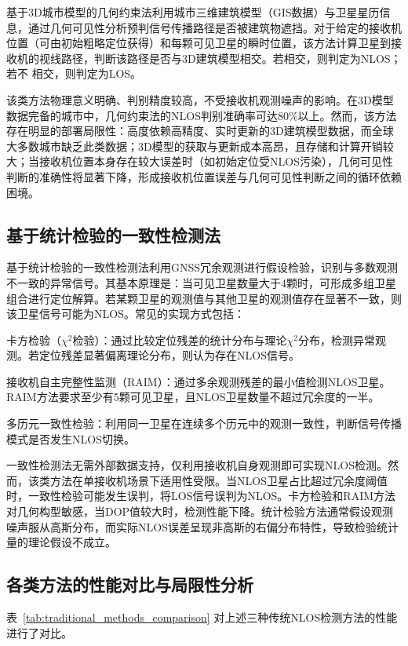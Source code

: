     基于3D城市模型的几何约束法利用城市三维建筑模型（GIS数据）与卫星星历信息，通过几何可见性分析预判信号传播路径是否被建筑物遮挡。对于给定的接收机位置（可由初始粗略定位获得）和每颗可见卫星的瞬时位置，该方法计算卫星到接收机的视线路径，判断该路径是否与3D建筑模型相交。若相交，则判定为NLOS；若不 相交，则判定为LOS。

    该类方法物理意义明确、判别精度较高，不受接收机观测噪声的影响。在3D模型数据完备的城市中，几何约束法的NLOS判别准确率可达$80\%$以上。然而，该方法存在明显的部署局限性：高度依赖高精度、实时更新的3D建筑模型数据，而全球大多数城市缺乏此类数据；3D模型的获取与更新成本高昂，且存储和计算开销较大；当接收机位置本身存在较大误差时（如初始定位受NLOS污染），几何可见性判断的准确性将显著下降，形成接收机位置误差与几何可见性判断之间的循环依赖困境。

\subsection{基于统计检验的一致性检测法}

    基于统计检验的一致性检测法利用GNSS冗余观测进行假设检验，识别与多数观测不一致的异常信号。其基本原理是：当可见卫星数量大于4颗时，可形成多组卫星组合进行定位解算。若某颗卫星的观测值与其他卫星的观测值存在显著不一致，则该卫星信号可能为NLOS。常见的实现方式包括：

    卡方检验（$\chi^2$检验）：通过比较定位残差的统计分布与理论$\chi^2$分布，检测异常观测。若定位残差显著偏离理论分布，则认为存在NLOS信号。

    接收机自主完整性监测（RAIM）：通过多余观测残差的最小值检测NLOS卫星。RAIM方法要求至少有5颗可见卫星，且NLOS卫星数量不超过冗余度的一半。

    多历元一致性检验：利用同一卫星在连续多个历元中的观测一致性，判断信号传播模式是否发生NLOS切换。

    一致性检测法无需外部数据支持，仅利用接收机自身观测即可实现NLOS检测。然而，该类方法在单接收机场景下适用性受限。当NLOS卫星占比超过冗余度阈值时，一致性检验可能发生误判，将LOS信号误判为NLOS。卡方检验和RAIM方法对几何构型敏感，当DOP值较大时，检测性能下降。统计检验方法通常假设观测噪声服从高斯分布，而实际NLOS误差呈现非高斯的右偏分布特性，导致检验统计量的理论假设不成立。

\subsection{各类方法的性能对比与局限性分析}

    表~\ref{tab:traditional_methods_comparison} 对上述三种传统NLOS检测方法的性能进行了对比。

